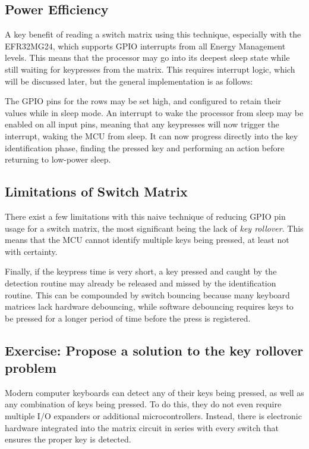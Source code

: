 \documentclass[
  9pt,
  letterpaper,
  abstract,
  titlepage]{scrbook}
\begin{document}
\subsection{Power Efficiency}\label{power-efficiency}

A key benefit of reading a switch matrix using this technique,
especially with the EFR32MG24, which supports GPIO interrupts from all
Energy Management levels. This means that the processor may go into its
deepest sleep state while still waiting for keypresses from the matrix.
This requires interrupt logic, which will be discussed later, but the
general implementation is as follows:

The GPIO pins for the rows may be set high, and configured to retain
their values while in sleep mode. An interrupt to wake the processor
from sleep may be enabled on all input pins, meaning that any keypresses
will now trigger the interrupt, waking the MCU from sleep. It can now
progress directly into the key identification phase, finding the pressed
key and performing an action before returning to low-power sleep.

\subsection{Limitations of Switch
Matrix}\label{limitations-of-switch-matrix}

There exist a few limitations with this naive technique of reducing GPIO
pin usage for a switch matrix, the most significant being the lack of
\emph{key rollover}. This means that the MCU cannot identify multiple
keys being pressed, at least not with certainty.

Finally, if the keypress time is very short, a key pressed and caught by
the detection routine may already be released and missed by the
identification routine. This can be compounded by switch bouncing
because many keyboard matrices lack hardware debouncing, while software
debouncing requires keys to be pressed for a longer period of time
before the press is registered.

\subsection{Exercise: Propose a solution to the key rollover
problem}\label{exercise-propose-a-solution-to-the-key-rollover-problem}

Modern computer keyboards can detect any of their keys being pressed, as
well as any combination of keys being pressed. To do this, they do not
even require multiple I/O expanders or additional microcontrollers.
Instead, there is electronic hardware integrated into the matrix circuit
in series with every switch that ensures the proper key is detected.
\end{document}
